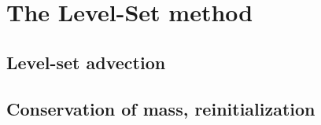 \chapter{The Level-Set method}
\section{Level-set advection}
\section{Conservation of mass, reinitialization}
